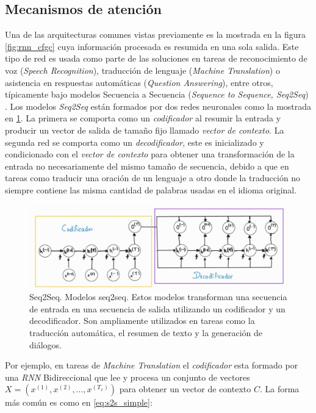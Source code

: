 \subsection{Mecanismos de atención} \label{section:att}

Una de las arquitecturas comunes vistas previamente es la mostrada en la figura \ref{fig:rnn_cfgc} cuya información
procesada es resumida en una sola salida. Este tipo de red es usada como parte de las soluciones en
tareas de reconocimiento de voz (\textit{Speech Recognition}), traducción de lenguaje
(\textit{Machine Translation}) o asistencia en respuestas automáticas (\textit{Question Answering}), entre
otros,
típicamente bajo modelos Secuencia a Secuencia (\textit{Sequence to Sequence, Seq2Seq})
\cite{DBLP:journals/corr/ChoMGBSB14}. Los modelos
\textit{Seq2Seq} están formados por dos redes neuronales como la mostrada en \ref{fig:seq2seq}. La
primera se comporta como un \textit{codificador} al resumir la entrada y producir un vector de salida
de tamaño fijo llamado \textit{vector de contexto}. La segunda red se comporta como un
\textit{decodificador}, este es inicializado y condicionado con el
\textit{vector de contexto} para obtener una transformación de la entrada no necesariamente del
mismo tamaño de secuencia, debido a que en tareas como traducir una oración de un lenguaje a otro
donde la traducción no siempre contiene las misma cantidad de palabras usadas en el idioma original.

\begin{figure}[ht!]
    \centering
    \includegraphics[width=1.0 \textwidth]{Chapters/2. Transformer/Figures/rnn/seq2seq.jpg}
    \caption{Seq2Seq. Modelos seq2seq. Estos modelos transforman una secuencia de entrada en una
             secuencia de salida utilizando un codificador y un decodificador. Son ampliamente
             utilizados en tareas como la traducción automática, el resumen de texto y la generación
             de diálogos.}
    \label{fig:seq2seq}
\end{figure}

Por ejemplo, en tareas de \textit{Machine Translation} el \textit{codificador} esta formado por una
\textit{RNN} Bidireccional que lee y procesa un conjunto de
vectores $X = (x^{(1)}, x^{(2)}, \dots, x^{(T_x)})$ para obtener un vector de contexto $C$. La forma
más común es como en \ref{eq:s2s_simple}:

